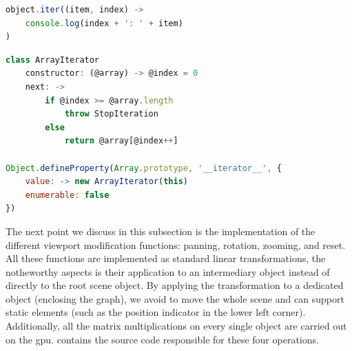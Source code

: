 \begin{lstlisting}[caption={Simple iteration over an iterable object.},label=lst:iteration,language=javascript]
object.iter((item, index) ->
    console.log(index + ': ' + item)
)
\end{lstlisting}

\begin{lstlisting}[caption={Extension of the \texttt{Array} object with the iterator pattern.},label=lst:array-iter,language=javascript]
class ArrayIterator
    constructor: (@array) -> @index = 0
    next: ->
        if @index >= @array.length
            throw StopIteration
        else
            return @array[@index++]

Object.defineProperty(Array.prototype, '__iterator__', {
    value: -> new ArrayIterator(this)
    enumerable: false
})
\end{lstlisting}

The next point we discuss in this subsection is the implementation of the different viewport modification functions: panning, rotation, zooming, and reset. All these functions are implemented as standard linear transformations, the notheworthy aspects is their application to an intermediary object instead of directly to the root scene object. By applying the transformation to a dedicated object (enclosing the graph), we avoid to move the whole scene and can support static elements (such as the position indicator in the lower left corner). Additionally, all the matrix multiplications on every single object are carried out on the \gls{gpu}.  contains the source code responsible for these four operations.

